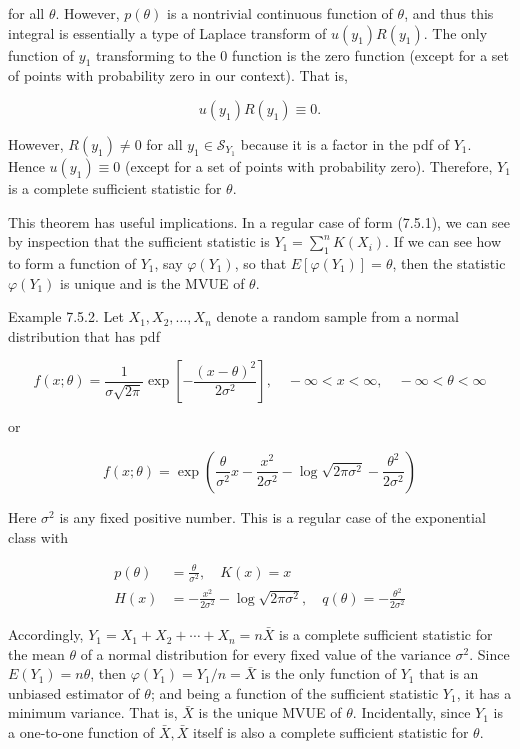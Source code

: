 for all $\theta$. However, $p(\theta)$ is a nontrivial continuous function of $\theta$, and thus this integral is essentially a type of Laplace transform of $u\left(y_{1}\right) R\left(y_{1}\right)$. The only function of $y_{1}$ transforming to the 0 function is the zero function (except for a set of points with probability zero in our context). That is,

$$
u\left(y_{1}\right) R\left(y_{1}\right) \equiv 0 .
$$

However, $R\left(y_{1}\right) \neq 0$ for all $y_{1} \in \mathcal{S}_{Y_{1}}$ because it is a factor in the pdf of $Y_{1}$. Hence $u\left(y_{1}\right) \equiv 0$ (except for a set of points with probability zero). Therefore, $Y_{1}$ is a complete sufficient statistic for $\theta$.

This theorem has useful implications. In a regular case of form (7.5.1), we can see by inspection that the sufficient statistic is $Y_{1}=\sum_{1}^{n} K\left(X_{i}\right)$. If we can see how to form a function of $Y_{1}$, say $\varphi\left(Y_{1}\right)$, so that $E\left[\varphi\left(Y_{1}\right)\right]=\theta$, then the statistic $\varphi\left(Y_{1}\right)$ is unique and is the MVUE of $\theta$.

Example 7.5.2. Let $X_{1}, X_{2}, \ldots, X_{n}$ denote a random sample from a normal distribution that has pdf

$$
f(x ; \theta)=\frac{1}{\sigma \sqrt{2 \pi}} \exp \left[-\frac{(x-\theta)^{2}}{2 \sigma^{2}}\right], \quad-\infty<x<\infty, \quad-\infty<\theta<\infty
$$

or

$$
f(x ; \theta)=\exp \left(\frac{\theta}{\sigma^{2}} x-\frac{x^{2}}{2 \sigma^{2}}-\log \sqrt{2 \pi \sigma^{2}}-\frac{\theta^{2}}{2 \sigma^{2}}\right)
$$

Here $\sigma^{2}$ is any fixed positive number. This is a regular case of the exponential class with

$$
\begin{aligned}
p(\theta) & =\frac{\theta}{\sigma^{2}}, \quad K(x)=x \\
H(x) & =-\frac{x^{2}}{2 \sigma^{2}}-\log \sqrt{2 \pi \sigma^{2}}, \quad q(\theta)=-\frac{\theta^{2}}{2 \sigma^{2}}
\end{aligned}
$$

Accordingly, $Y_{1}=X_{1}+X_{2}+\cdots+X_{n}=n \bar{X}$ is a complete sufficient statistic for the mean $\theta$ of a normal distribution for every fixed value of the variance $\sigma^{2}$. Since $E\left(Y_{1}\right)=n \theta$, then $\varphi\left(Y_{1}\right)=Y_{1} / n=\bar{X}$ is the only function of $Y_{1}$ that is an unbiased estimator of $\theta$; and being a function of the sufficient statistic $Y_{1}$, it has a minimum variance. That is, $\bar{X}$ is the unique MVUE of $\theta$. Incidentally, since $Y_{1}$ is a one-to-one function of $\bar{X}, \bar{X}$ itself is also a complete sufficient statistic for $\theta$.

